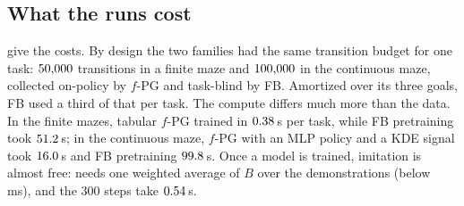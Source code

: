 \begin{table}[ht]
\centering\small
\caption{Training and evaluation cost per task (core suite; means over the  finite and  continuous runs of each method). Training transitions are those given to the learner; evaluation transitions are generated by the evaluator only. Wall times are per-task phase times in seconds on one laptop CPU (rule (iv)). \ERFB{} and \DMFB{} share one evaluation job per adaptation ( \ERFB{} and  \DMFB{} checkpoints): its cost is shown once for the pair and counted once in the totals.}\label{tab:costs}
\resizebox{\textwidth}{!}{}
\end{table}

\begin{table}[ht]
\centering\small
\caption{Cost components per phase (core suite; per-task phase times; mean $\pm$ sample SD over runs where it varies, and over the distinct models for FB pretraining, each model counted once).}\label{tab:cost-components}

\end{table}

\subsection{What the runs cost}

 give the costs.
By design the two families had the same transition budget for one task: $\vn{budget.same.f}{50{,}000}$ transitions in a finite maze and $\vn{budget.same.c}{100{,}000}$ in the continuous maze, collected on-policy by $f$-PG and task-blind by FB.
Amortized over its three goals, FB used a third of that per task.
The compute differs much more than the data.
In the finite mazes, tabular $f$-PG trained in $\vn{s14.fpg.wall.f}{0.38}$\,s per task, while FB pretraining took $\vn{s14.fb.wall.f}{51.2}$\,s; in the continuous maze, $f$-PG with an MLP policy and a KDE signal took $\vn{s14.fpg.wall.c}{16.0}$\,s and FB pretraining $\vn{s14.fb.wall.c}{99.8}$\,s.
Once a model is trained, imitation is almost free: \ERFB{} needs one weighted average of $B$ over the demonstrations (below \,ms), and the 300 \DMFB{} steps take $\vn{s14.dm.wall}{0.54}$\,s.

